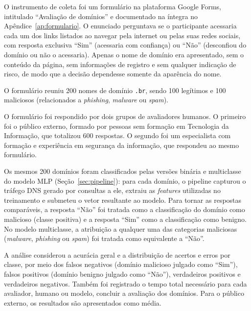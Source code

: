 O instrumento de coleta foi um formulário na plataforma Google Forms, intitulado ``Avaliação de domínios'' e documentado na íntegra no Apêndice~\ref{ap:formulario}. O enunciado perguntava se o participante acessaria cada um dos links listados ao navegar pela internet ou pelas suas redes sociais, com resposta exclusiva ``Sim'' (acessaria com confiança) ou ``Não'' (desconfiou do domínio ou não o acessaria). Apenas o nome de domínio era apresentado, sem o conteúdo da página, sem informações de registro e sem qualquer indicação de risco, de modo que a decisão dependesse somente da aparência do nome.

O formulário reuniu 200 nomes de domínio \texttt{.br}, sendo 100 legítimos e 100 maliciosos (relacionados a \textit{phishing}, \textit{malware} ou \textit{spam}).

O formulário foi respondido por dois grupos de avaliadores humanos. O primeiro foi o público externo, formado por pessoas sem formação em Tecnologia da Informação, que totalizou 600 respostas. O segundo foi um especialista com formação e experiência em segurança da informação, que respondeu ao mesmo formulário.

Os mesmos 200 domínios foram classificados pelas versões binária e multiclasse do modelo MLP (Seção~\ref{sec:pipeline}): para cada domínio, o pipeline capturou o tráfego DNS gerado por consultas a ele, extraiu as \textit{features} utilizadas no treinamento e submeteu o vetor resultante ao modelo. Para tornar as respostas comparáveis, a resposta ``Não'' foi tratada como a classificação do domínio como malicioso (classe positiva) e a resposta ``Sim'' como a classificação como benigno. No modelo multiclasse, a atribuição a qualquer uma das categorias maliciosas (\textit{malware}, \textit{phishing} ou \textit{spam}) foi tratada como equivalente a ``Não''.

A análise considerou a acurácia geral e a distribuição de acertos e erros por classe, por meio dos falsos negativos (domínio malicioso julgado como ``Sim''), falsos positivos (domínio benigno julgado como ``Não''), verdadeiros positivos e verdadeiros negativos. Também foi registrado o tempo total necessário para cada avaliador, humano ou modelo, concluir a avaliação dos domínios. Para o público externo, os resultados são apresentados como média.